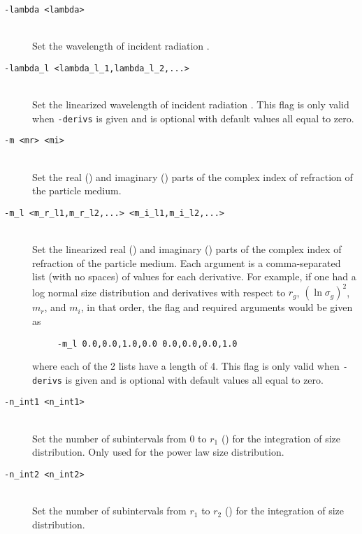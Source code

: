 \begin{description}
\item[\texttt{-lambda <lambda>}] \hfill \\
Set the wavelength of incident radiation .

\item[\texttt{-lambda\_l <lambda\_l\_1,lambda\_l\_2,...>}] \hfill \\
Set the linearized wavelength of incident radiation .  This flag is only valid when \texttt{-derivs} is given and is optional with default values all equal to zero.

\item[\texttt{-m <mr> <mi>}] \hfill \\
Set the real () and imaginary () parts of the complex index of refraction of the particle medium.

\item[\texttt{-m\_l <m\_r\_l1,m\_r\_l2,...> <m\_i\_l1,m\_i\_l2,...>}] \hfill \\
Set the linearized real () and imaginary () parts of the complex index of refraction of the particle medium.  Each argument is a comma-separated list (with no spaces) of values for each derivative.  For example, if one had a log normal size distribution and derivatives with respect to $r_{g}$, $(\ln \sigma_{g})^{2}$, $m_{r}$, and $m_{i}$, in that order, the flag and required arguments would be given as
\begin{verbatim}
     -m_l 0.0,0.0,1.0,0.0 0.0,0.0,0.0,1.0
\end{verbatim}
where each of the 2 lists have a length of 4.  This flag is only valid when \texttt{-derivs} is given and is optional with default values all equal to zero.

\item[\texttt{-n\_int1 <n\_int1>}] \hfill \\
Set the number of subintervals from 0 to $r_{1}$ () for the integration of size distribution.  Only used for the power law size distribution.

\item[\texttt{-n\_int2 <n\_int2>}] \hfill \\
Set the number of subintervals from $r_{1}$ to $r_{2}$ () for the integration of size distribution.


\end{description}
